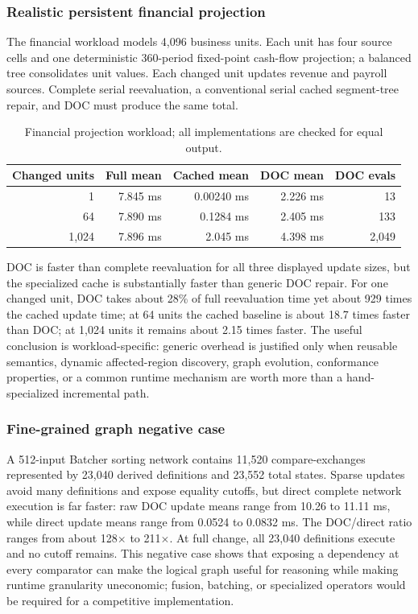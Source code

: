 \subsubsection{Realistic persistent financial projection}
The financial workload models 4,096 business units. Each unit has four source cells and one deterministic 360-period fixed-point cash-flow projection; a balanced tree consolidates unit values. Each changed unit updates revenue and payroll sources. Complete serial reevaluation, a conventional serial cached segment-tree repair, and DOC must produce the same total.
\begin{table}[t]
\centering\footnotesize
\caption{Financial projection workload; all implementations are checked for equal output.}\label{tab:financial}
\begin{tabular}{@{}rrrrr@{}}\toprule
Changed units & Full mean & Cached mean & DOC mean & DOC evals\\ \midrule
1 & 7.845 ms & 0.00240 ms & 2.226 ms & 13\\
64 & 7.890 ms & 0.1284 ms & 2.405 ms & 133\\
1,024 & 7.896 ms & 2.045 ms & 4.398 ms & 2,049\\ \bottomrule
\end{tabular}
\end{table}
DOC is faster than complete reevaluation for all three displayed update sizes, but the specialized cache is substantially faster than generic DOC repair. For one changed unit, DOC takes about 28\% of full reevaluation time yet about 929 times the cached update time; at 64 units the cached baseline is about 18.7 times faster than DOC; at 1,024 units it remains about 2.15 times faster. The useful conclusion is workload-specific: generic overhead is justified only when reusable semantics, dynamic affected-region discovery, graph evolution, conformance properties, or a common runtime mechanism are worth more than a hand-specialized incremental path.

\subsubsection{Fine-grained graph negative case}
A 512-input Batcher sorting network contains 11,520 compare-exchanges represented by 23,040 derived definitions and 23,552 total states. Sparse updates avoid many definitions and expose equality cutoffs, but direct complete network execution is far faster: raw DOC update means range from 10.26 to 11.11 ms, while direct update means range from 0.0524 to 0.0832 ms. The DOC/direct ratio ranges from about 128$\times$ to 211$\times$. At full change, all 23,040 definitions execute and no cutoff remains. This negative case shows that exposing a dependency at every comparator can make the logical graph useful for reasoning while making runtime granularity uneconomic; fusion, batching, or specialized operators would be required for a competitive implementation.

